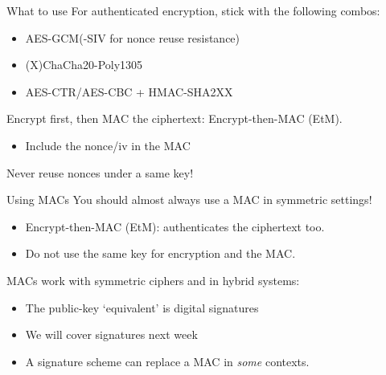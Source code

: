 \begin{frame}{What to use}
  For authenticated encryption, stick with the following combos:
  \begin{itemize}[<+(1)->]
    \item AES-GCM(-SIV for nonce reuse resistance)
    \item (X)ChaCha20-Poly1305
    \item AES-CTR/AES-CBC + HMAC-SHA2XX
  \end{itemize}

  \vspace*{1em}

  \pause
  Encrypt first, then MAC the ciphertext: Encrypt-then-MAC (EtM).
  \begin{itemize}[<+(1)->]
    \item Include the nonce/iv in the MAC
  \end{itemize}

  \vspace*{1em}

  \pause
  Never reuse nonces under a same key!
\end{frame}

\begin{frame}{Using MACs}
  You should almost always use a MAC in symmetric settings!
  \begin{itemize}[<+(1)->]
    \item Encrypt-then-MAC (EtM): authenticates the ciphertext too.
    \item Do not use the same key for encryption and the MAC.
  \end{itemize}

  \vspace*{1em}

  \pause
  MACs work with symmetric ciphers and in hybrid systems:
  \begin{itemize}[<+(1)->]
    \item The public-key `equivalent' is digital signatures
    \item We will cover signatures next week
    \item A signature scheme can replace a MAC in \emph{some} contexts.
  \end{itemize}
\end{frame}

